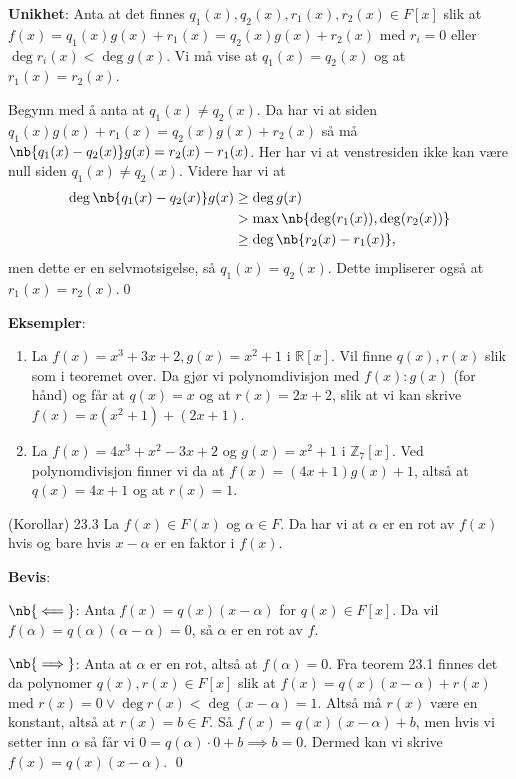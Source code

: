 \textbf{Unikhet}: Anta at det finnes $q_1(x),q_2(x),r_1(x),r_2(x)\in F[x]$ slik at
$f(x)=q_1(x)g(x)+r_1(x) = q_2(x)g(x) + r_2(x)$ med $r_i=0$ eller $\deg r_i(x) <\deg g(x)$. Vi må
vise at $q_1(x) = q_2(x)$ og at $r_1(x)=r_2(x)$. 

Begynn med å anta at $q_1(x)\neq q_2(x)$. Da har vi at siden 
$q_1(x)g(x) + r_1(x) = q_2(x)g(x) + r_2(x)$ så må $\nb{q_1(x)-q_2(x)}g(x)=r_2(x)-r_1(x)$. Her har
vi at venstresiden ikke kan være null siden $q_1(x)\neq q_2(x)$. Videre har vi at
\begin{align}
  \deg \nb{q_1(x)-q_2(x)}g(x) &\geq \deg g(x) \\
                              &>\max \nb{\deg(r_1(x)),\deg(r_2(x))} \\
                              &\geq \deg \nb{r_2(x)-r_1(x)},
\end{align}
men dette er en selvmotsigelse, så $q_1(x) =q_2(x)$. Dette impliserer også at $r_1(x)=r_2(x)$.\qed

\textbf{Eksempler}: 
\begin{enumerate}
  \item La $f(x)=x^3+3x+2,g(x)=x^2+1$ i $\mathbb{R}[x]$. Vil finne $q(x),r(x)$ slik som i teoremet
    over. Da gjør vi polynomdivisjon med $f(x) : g(x)$ (for hånd) og får at $q(x)=x$ og at
    $r(x)=2x+2$, slik at vi kan skrive $f(x)=x(x^2+1) + (2x+1)$. 
  \item La $f(x) = 4x^3+x^2-3x+2$ og $g(x)=x^2 + 1$ i $\mathbb{Z}_7[x]$. Ved polynomdivisjon
    finner vi da at $f(x)=(4x+1)g(x)+1$, altså at $q(x)=4x+1$ og at $r(x)=1$.
\end{enumerate} 

\begin{theorem*}{(Korollar) 23.3}{}
  La $f(x)\in F(x)$ og $\alpha\in F$. Da har vi at $\alpha$ er en rot av $f(x)$ hvis og bare hvis
  $x-\alpha$ er en faktor i $f(x)$.
\end{theorem*}

\textbf{Bevis}: 

$\nb{\impliedby}$: Anta $f(x)=q(x)(x-\alpha)$ for $q(x)\in F[x]$. Da vil 
$f(\alpha)=q(\alpha)(\alpha-\alpha)=0$, så $\alpha$ er en rot av $f$.

$\nb{\implies}$: Anta at $\alpha$ er en rot, altså at $f(\alpha)=0$. Fra teorem 23.1 finnes det
da polynomer $q(x), r(x)\in F[x]$ slik at $f(x)=q(x)(x-\alpha)+r(x)$ med 
$r(x)=0 \vee \deg r(x) < \deg (x-\alpha) = 1$. Altså må $r(x)$ være en konstant, altså at
$r(x)=b\in F$. Så $f(x)=q(x)(x-\alpha) + b$, men hvis vi setter inn $\alpha$ så får vi
$0=q(\alpha)\cdot 0 + b\implies b=0$. Dermed kan vi skrive $f(x)=q(x)(x-\alpha)$. \qed

